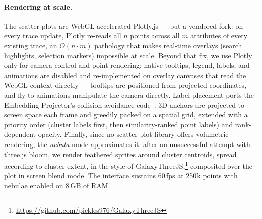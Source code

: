 \paragraph{Rendering at scale.}
The scatter plots are WebGL-accelerated Plotly.js --- but a vendored fork: on every trace update, Plotly re-reads all $n$ points across all $m$ attributes of every existing trace, an $O(n \cdot m)$ pathology that makes real-time overlays (search highlights, selection markers) impossible at scale. Beyond that fix, we use Plotly only for camera control and point rendering: native tooltips, legend, labels, and animations are disabled and re-implemented on overlay canvases that read the WebGL context directly --- tooltips are positioned from projected coordinates, and fly-to animations manipulate the camera directly. Label placement ports the Embedding Projector's collision-avoidance code~\cite{smilkov2016embeddingprojectorinteractivevisualization}: 3D anchors are projected to screen space each frame and greedily packed on a spatial grid, extended with a priority order (cluster labels first, then similarity-ranked point labels) and rank-dependent opacity. Finally, since no scatter-plot library offers volumetric rendering, the \emph{nebula} mode approximates it: after an unsuccessful attempt with three.js bloom, we render feathered sprites around cluster centroids, spread according to cluster extent, in the style of GalaxyThreeJS,\footnote{\url{https://github.com/pickles976/GalaxyThreeJS}} composited over the plot in screen blend mode. The interface sustains 60\,fps at 250k points with nebulae enabled on 8\,GB of RAM.

